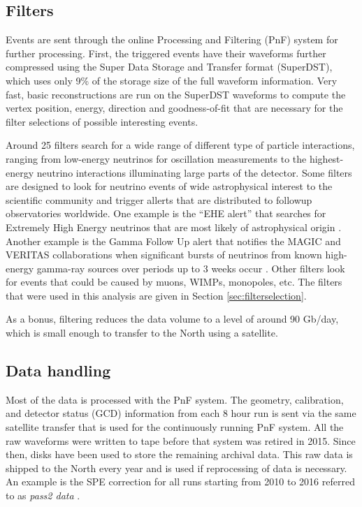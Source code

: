 \subsection{Filters}
\label{subsec:filters}
Events are sent through the online Processing and Filtering (PnF) system for further processing. First, the triggered events have their waveforms further compressed using the Super Data Storage and Transfer format (SuperDST), which uses only 9\% of the storage size of the full waveform information. Very fast, basic reconstructions are run on the SuperDST waveforms to compute the vertex position, energy, direction and goodness-of-fit that are necessary for the filter selections of possible interesting events.

Around 25 filters search for a wide range of different type of particle interactions, ranging from low-energy neutrinos for oscillation measurements to the highest-energy neutrino interactions illuminating large parts of the detector. Some filters are designed to look for neutrino events of wide astrophysical interest to the scientific community and trigger allerts that are distributed to followup observatories worldwide. One example is the ``EHE alert'' that searches for Extremely High Energy neutrinos that are most likely of astrophysical origin \cite{Aartsen:2016lmt}. Another example is the Gamma Follow Up alert that notifies the MAGIC and VERITAS collaborations when significant bursts of neutrinos from known high-energy gamma-ray sources over periods up to 3 weeks occur \cite{1412973}. Other filters look for events that could be caused by muons, WIMPs, monopoles, etc. The filters that were used in this analysis are given in Section \ref{sec:filterselection}.

As a bonus, filtering reduces the data volume to a level of around 90 Gb/day, which is small enough to transfer to the North using a satellite.

\subsection{Data handling}
\label{subsec:datahandling}
Most of the data is processed with the PnF system. The geometry, calibration, and detector status (GCD) information from each 8 hour run is sent via the same satellite transfer that is used for the continuously running PnF system. All the raw waveforms were written to tape before that system was retired in 2015. Since then, disks have been used to store the remaining archival data. This raw data is shipped to the North every year and is used if reprocessing of data is necessary. An example is the SPE correction for all runs starting from 2010 to 2016 referred to as \textit{pass2 data} \cite{pass2}. \\


